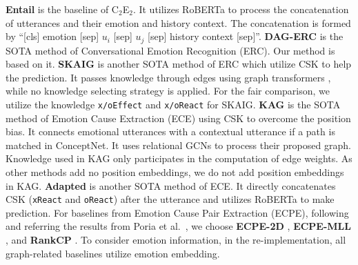 \documentclass{article}
\begin{document}
\textbf{Entail} is the baseline of C${_2}$E${_2}$. It utilizes RoBERTa to process the concatenation of utterances and their emotion and history context. The concatenation is formed by ``[cls] emotion [sep] $u_i$ [sep] $u_j$ [sep] history context [sep]''. \textbf{DAG-ERC} \cite{DAG} is the SOTA method of Conversational Emotion Recognition (ERC). Our method is based on it. \textbf{SKAIG} \cite{SKAIG} is another SOTA method of ERC which utilize CSK to help the prediction. It passes knowledge through edges using graph transformers \cite{TransformerConv}, while no knowledge selecting strategy is applied. For the fair comparison, we utilize the knowledge \texttt{x/oEffect} and \texttt{x/oReact} for SKAIG. \textbf{KAG} \cite{KAG} is the SOTA method of Emotion Cause Extraction (ECE) using CSK to overcome the position bias. It connects emotional utterances with a contextual utterance if a path is matched in ConceptNet. It uses relational GCNs to process their proposed graph. Knowledge used in KAG only participates in the computation of edge weights. As other methods add no position embeddings, we do not add position embeddings in KAG. \textbf{Adapted} \cite{AdaptedKnow} is another SOTA method of ECE. It directly concatenates 
CSK (\texttt{xReact} and \texttt{oReact}) after the utterance and utilizes RoBERTa to make prediction. For baselines from Emotion Cause Pair Extraction (ECPE), following and referring the results from Poria et al.~, we choose \textbf{ECPE-2D} \cite{ECPE_2D}, \textbf{ECPE-MLL} \cite{SlidingWindow}, and \textbf{RankCP} \cite{Rank_Emotion}. To consider emotion information, in the re-implementation, all graph-related baselines utilize emotion embedding. 
\end{document}
